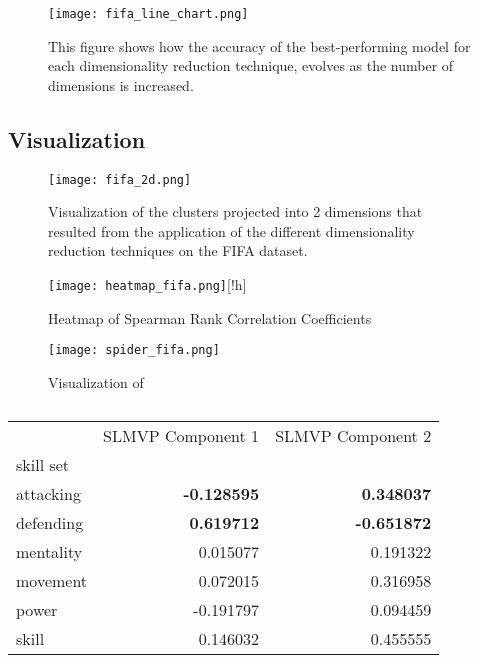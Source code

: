 \begin{figure}[!h]
    \centering
    \texttt{[image: fifa\_line\_chart.png]}
    \caption{This figure shows how the accuracy of the best-performing model for each dimensionality reduction technique, evolves as the number of dimensions is increased.}
    \label{fig:fifa_line_chart}
\end{figure}


\subsection{Visualization}

\begin{figure}[!h]
    \centering
    \texttt{[image: fifa\_2d.png]}
    \caption{Visualization of the clusters projected into 2 dimensions that resulted from the application of the different dimensionality reduction techniques on the FIFA dataset.}
    \label{fig:fifa_2d}
\end{figure}

\begin{figure}
    \centering
    \texttt{[image: heatmap\_fifa.png]}[!h]
    \caption{Heatmap of Spearman Rank Correlation Coefficients}
    \label{fig:heatmap-fifa}
\end{figure}

\begin{figure}[!h]
    \centering
    \texttt{[image: spider\_fifa.png]}
    \caption{Visualization of }
    \label{fig:spider_fifa}
\end{figure}

\begin{table}[!h]
    \begin{tabular}{lrr}
        \toprule
        {}        & SLMVP Component 1  & SLMVP Component 2  \\
        skill set &                    &                    \\
        \midrule
        attacking & \textbf{-0.128595} & \textbf{0.348037}  \\
        defending & \textbf{0.619712}  & \textbf{-0.651872} \\
        mentality & 0.015077           & 0.191322           \\
        movement  & 0.072015           & 0.316958           \\
        power     & -0.191797          & 0.094459           \\
        skill     & 0.146032           & 0.455555           \\
        \bottomrule
    \end{tabular}
    \caption{}
    \label{tab:fifa-corr}
\end{table}

